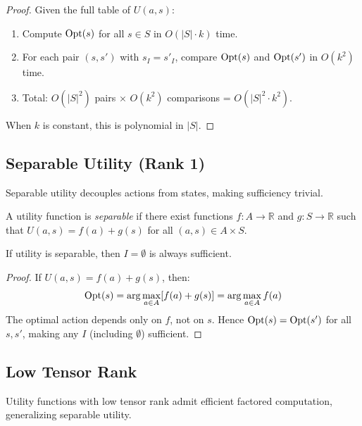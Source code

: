 \begin{proof}
Given the full table of $U(a,s)$:
\begin{enumerate}
\item Compute $\mathrm{Opt}(s)$ for all $s \in S$ in $O(|S| \cdot k)$ time.
\item For each pair $(s, s')$ with $s_I = s'_I$, compare $\mathrm{Opt}(s)$ and $\mathrm{Opt}(s')$ in $O(k^2)$ time.
\item Total: $O(|S|^2)$ pairs $\times$ $O(k^2)$ comparisons = $O(|S|^2 \cdot k^2)$.
\end{enumerate}
When $k$ is constant, this is polynomial in $|S|$.
\end{proof}

\subsection{Separable Utility (Rank 1)}\label{sec:tract-separable}

Separable utility decouples actions from states, making sufficiency trivial.

\begin{definition}\label{def:separable}
A utility function is \emph{separable} if there exist functions $f : A \to \mathbb{R}$ and $g : S \to \mathbb{R}$ such that $U(a,s) = f(a) + g(s)$ for all $(a,s) \in A \times S$.
\end{definition}

\begin{theorem}\label{thm:separable}
If utility is separable, then $I = \emptyset$ is always sufficient.
\end{theorem}


\begin{proof}
If $U(a, s) = f(a) + g(s)$, then:
\[
\mathrm{Opt}(s) = \arg\max_{a \in A} [f(a) + g(s)] = \arg\max_{a \in A} f(a)
\]
The optimal action depends only on $f$, not on $s$. Hence $\mathrm{Opt}(s) = \mathrm{Opt}(s')$ for all $s, s'$, making any $I$ (including $\emptyset$) sufficient.
\end{proof}

\subsection{Low Tensor Rank}\label{sec:tract-tensor}

Utility functions with low tensor rank admit efficient factored computation, generalizing separable utility.

